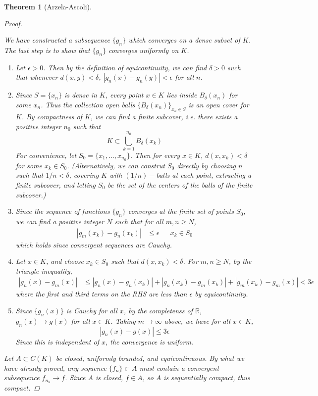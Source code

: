 \documentclass[10pt]{article}         %
\newtheorem{theorem}{Theorem}[section]
\theoremstyle{remark}
\newcommand{\R}{\mathbb{R}}
\begin{document}
\begin{theorem}[Arzela-Ascoli]
\begin{proof}
\begin{enumerate}
\end{enumerate}
We have constructed a subsequence $\{g_n\}$ which converges on a dense subset of $K$. The last step is to show that $\{g_n\}$ converges uniformly on $K$.
\begin{enumerate}
    \item Let $\epsilon > 0$. Then by the definition of equicontinuity, we can find $\delta > 0$ such that whenever $d(x,y) < \delta$, $|g_n(x) - g_n(y)| < \epsilon$ for all $n$.
    \item Since $S = \{ x_n \}$ is dense in $K$, every point $x \in K$ lies inside $B_\delta(x_n)$ for some $x_n$. Thus the collection open balls $\{ B_\delta(x_n) \}_{x_n \in S}$ is an open cover for $K$. By compactness of $K$, we can find a finite subcover, i.e. there exists a positive integer $n_0$ such that
    \[
    K \subset \bigcup_{k = 1}^{n_0} B_\delta(x_k)
    \]
    For convenience, let $S_0 = \{ x_1, \dots, x_{n_0} \}$. Then for every $x \in K$, $d(x, x_k) < \delta$ for some $x_k \in S_0$. (Alternatively, we can construt $S_0$ directly by choosing $n$ such that $1/n < \delta$, covering $K$ with $(1/n)-$balls at each point, extracting a finite subcover, and letting $S_0$ be the set of the centers of the balls of the finite subcover.)
    \item Since the sequence of functions $\{ g_n \}$ converges at the \emph{finite} set of points $S_0$, we can find a positive integer $N$ such that for all $m, n \geq N$,
    \begin{align*}
    |g_m(x_k) - g_n(x_k)| &\leq \epsilon && x_k \in S_0
    \end{align*}
    which holds since convergent sequences are Cauchy.
    \item Let $x \in K$, and choose $x_k \in S_0$ such that $d(x, x_k) < \delta$. For $m, n \geq N$, by the triangle inequality,
    \begin{align*}
    |g_n(x) - g_m(x)| &\leq |g_n(x) - g_n(x_k)| +
    |g_n(x_k) - g_m(x_k)| + |g_m(x_k) - g_m(x)| < 3\epsilon
    \end{align*}
    where the first and third terms on the RHS are less than $\epsilon$ by equicontinuity.
    \item Since $\{g_n(x)\}$ is Cauchy for all $x$, by the completenss of $\R$, $g_n(x) \rightarrow g(x)$ for all $x \in K$. Taking $m \rightarrow \infty$ above, we have for all $x \in K$,
    \[
    |g_n(x) - g(x)| \leq 3\epsilon
    \]
    Since this is independent of $x$, the convergence is uniform.
    \end{enumerate}
Let $A \subset C(K)$ be closed, uniformly bounded, and equicontinuous. By what we have already proved, any sequence $\{f_n\}\subset A$ must contain a convergent subsequence $f_{n_k} \rightarrow f$. Since $A$ is closed, $f \in A$, so $A$ is sequentially compact, thus compact.
\end{proof}
\end{theorem}
\end{document}
